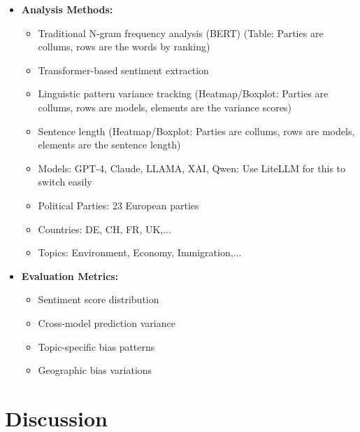 \documentclass{article}
\begin{document}
\begin{itemize}
    \item \textbf{Analysis Methods:}
       \begin{itemize}
           \item Traditional N-gram frequency analysis (BERT) (Table: Parties are collums, rows are the words by ranking)
           \item Transformer-based sentiment extraction
           \item Linguistic pattern variance tracking (Heatmap/Boxplot: Parties are collums, rows are models, elements are the variance scores)
           \item Sentence length (Heatmap/Boxplot: Parties are collums, rows are models, elements are the sentence length)
       \end{itemize}
   

       \begin{itemize}
           \item Models: GPT-4, Claude, LLAMA, XAI, Qwen: Use LiteLLM for this to switch easily
           \item Political Parties: 23   European parties
           \item Countries: DE, CH, FR, UK,...
           \item Topics: Environment, Economy, Immigration,...
       \end{itemize}
   
   \item \textbf{Evaluation Metrics:}
       \begin{itemize}
           \item Sentiment score distribution
           \item Cross-model prediction variance
           \item Topic-specific bias patterns
           \item Geographic bias variations
       \end{itemize}
\end{itemize}










\section{Discussion}



\newpage
\end{document}
